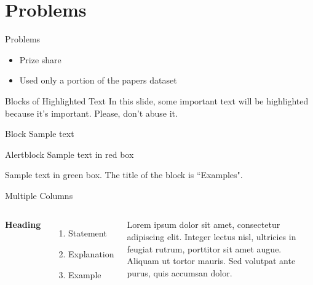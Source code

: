 \documentclass[aspectratio=169,xcolor=dvipsnames]{beamer}
\begin{document}
\section{Problems}

\begin{frame}{Problems}
	\begin{itemize}
		\item Prize share
		\item Used only a portion of the papers dataset
	\end{itemize}
\end{frame}


\begin{frame}{Blocks of Highlighted Text}
	In this slide, some important text will be \alert{highlighted} because it's important. Please, don't abuse it.

	\begin{block}{Block}
		Sample text
	\end{block}

	\begin{alertblock}{Alertblock}
		Sample text in red box
	\end{alertblock}

	\begin{examples}
		Sample text in green box. The title of the block is ``Examples".
	\end{examples}
\end{frame}


\begin{frame}{Multiple Columns}
	\begin{columns}[c] %

		\textbf{Heading}
		\begin{enumerate}
			\item Statement
			\item Explanation
			\item Example
		\end{enumerate}

		Lorem ipsum dolor sit amet, consectetur adipiscing elit. Integer lectus nisl, ultricies in feugiat rutrum, porttitor sit amet augue. Aliquam ut tortor mauris. Sed volutpat ante purus, quis accumsan dolor.

	\end{columns}
\end{frame}
\end{document}
